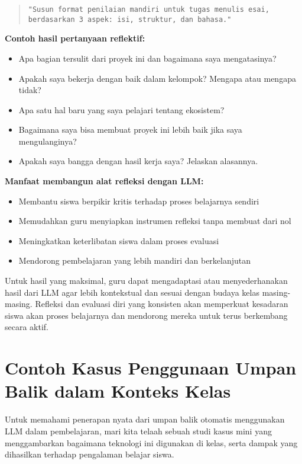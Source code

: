 \begin{quote}
	\centering
	\texttt{"Susun format penilaian mandiri untuk tugas menulis esai, berdasarkan 3 aspek: isi, struktur, dan bahasa."}
\end{quote}

\textbf{Contoh hasil pertanyaan reflektif:}
\begin{itemize}
	\item Apa bagian tersulit dari proyek ini dan bagaimana saya mengatasinya?
	\item Apakah saya bekerja dengan baik dalam kelompok? Mengapa atau mengapa tidak?
	\item Apa satu hal baru yang saya pelajari tentang ekosistem?
	\item Bagaimana saya bisa membuat proyek ini lebih baik jika saya mengulanginya?
	\item Apakah saya bangga dengan hasil kerja saya? Jelaskan alasannya.
\end{itemize}

\textbf{Manfaat membangun alat refleksi dengan LLM:}
\begin{itemize}
	\item Membantu siswa berpikir kritis terhadap proses belajarnya sendiri
	\item Memudahkan guru menyiapkan instrumen refleksi tanpa membuat dari nol
	\item Meningkatkan keterlibatan siswa dalam proses evaluasi
	\item Mendorong pembelajaran yang lebih mandiri dan berkelanjutan
\end{itemize}

Untuk hasil yang maksimal, guru dapat mengadaptasi atau menyederhanakan hasil dari LLM agar lebih kontekstual dan sesuai dengan budaya kelas masing-masing. Refleksi dan evaluasi diri yang konsisten akan memperkuat kesadaran siswa akan proses belajarnya dan mendorong mereka untuk terus berkembang secara aktif.


\section{Contoh Kasus Penggunaan Umpan Balik dalam Konteks Kelas}

Untuk memahami penerapan nyata dari umpan balik otomatis menggunakan LLM dalam pembelajaran, mari kita telaah sebuah studi kasus mini yang menggambarkan bagaimana teknologi ini digunakan di kelas, serta dampak yang dihasilkan terhadap pengalaman belajar siswa.

